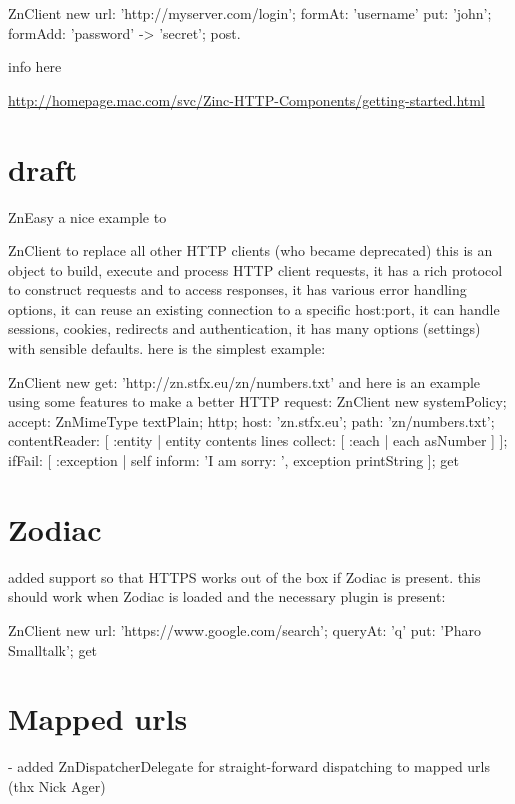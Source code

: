 \documentclass[a4paper,10pt,twoside]{book}
\begin{document}
\begin{code}{}
ZnClient new
	url: 'http://myserver.com/login';
	formAt: 'username' put: 'john';
	formAdd: 'password' -> 'secret';
	post.
\end{code}

info here

\url{http://homepage.mac.com/svc/Zinc-HTTP-Components/getting-started.html}


\section{draft}
ZnEasy a nice example to 

 ZnClient to replace all other HTTP clients (who became deprecated) this is an object to build, execute and process HTTP client requests,
it has a rich protocol to construct requests and to access responses, it has various error handling options, it can reuse an existing connection to a specific host:port, it can handle sessions, cookies, redirects and authentication, it has many options (settings) with sensible defaults.
here is the simplest example:




\begin{code}
    ZnClient new
      get: 'http://zn.stfx.eu/zn/numbers.txt'
and here is an example using some features to make a better HTTP request:
    ZnClient new
      systemPolicy;
      accept: ZnMimeType textPlain;
      http;
      host: 'zn.stfx.eu';
      path: 'zn/numbers.txt';
      contentReader: [ :entity | entity contents lines collect: [ :each | each asNumber ] ];
      ifFail: [ :exception | self inform: 'I am sorry: ', exception printString ];
      get
\end{code}      


\section{Zodiac}      
 added support so that HTTPS works out of the box if Zodiac is present.
this should work when Zodiac is loaded and the necessary plugin is present:
\begin{code}
    ZnClient new
      url: 'https://www.google.com/search';
      queryAt: 'q' put: 'Pharo Smalltalk';
      get
\end{code}      
      

\section{Mapped urls}
- added ZnDispatcherDelegate for straight-forward dispatching to mapped urls (thx Nick Ager)
\end{document}
